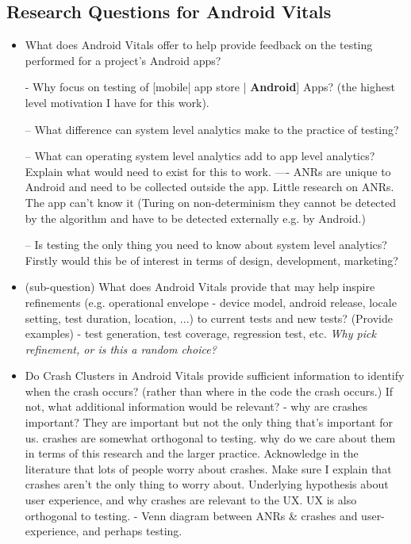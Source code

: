 \subsection{Research Questions for Android Vitals}
\begin{itemize}
    \item What does Android Vitals offer to help provide feedback on the testing performed for a project's Android apps? 
    
    - Why focus on testing of [mobile| app store | \textbf{Android}] Apps? (the highest level motivation I have for this work). 

-- What difference can system level analytics make to the practice of testing?

-- What can operating system level analytics add to app level analytics? Explain what would need to exist for this to work. 
---- ANRs are unique to Android and need to be collected outside the app. Little research on ANRs. The app can't know it (Turing on non-determinism they cannot be detected by the algorithm and have to be detected externally e.g. by Android.)

-- Is testing the only thing you need to know about system level analytics? Firstly would this be of interest in terms of design, development, marketing? 

    \item (sub-question) What does Android Vitals provide that may help inspire refinements (e.g. operational envelope - device model, android release, locale setting, test duration, location, ...) to current tests and new tests? (Provide examples) 
    - test generation, test coverage, regression test, etc. \textit{Why pick refinement, or is this a random choice?}
    
    \item Do Crash Clusters in Android Vitals provide sufficient information to identify when the crash occurs? (rather than where in the code the crash occurs.) If not, what additional information would be relevant? 
    - why are crashes important? They are important but not the only thing that's important for us. crashes are somewhat orthogonal to testing. why do we care about them in terms of this research and the larger practice. Acknowledge in the literature that lots of people worry about crashes. Make sure I explain that crashes aren't the only thing to worry about. Underlying hypothesis about user experience, and why crashes are relevant to the UX. UX is also orthogonal to testing. 
    - Venn diagram between ANRs \& crashes and user-experience, and perhaps testing. 
    

\end{itemize}
